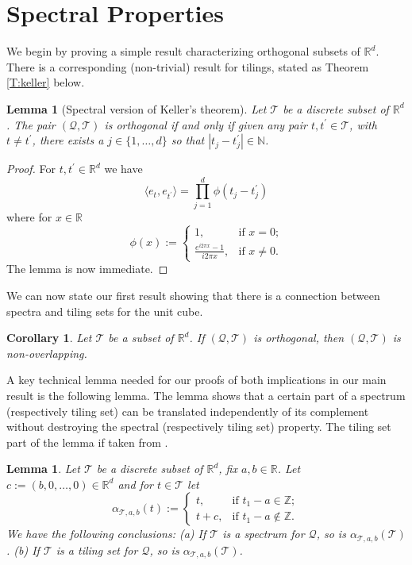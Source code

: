 \documentclass[12pt]{amsart}
\theoremstyle{plain}
\newtheorem{corollary}[theorem]{Corollary}
\newtheorem{lemma}[theorem]{Lemma}
\numberwithin{equation}{section}
\newcommand{\Q}{\ensuremath{\mathcal{Q}}\xspace}
\newcommand{\T}{\ensuremath{\mathcal{T}}\xspace}
\newcommand{\Rd}{\ensuremath{\mathbb{R}^{d}}\xspace}
\newcommand{\R}{\ensuremath{\mathbb{R}}\xspace}
\newcommand{\N}{\ensuremath{\mathbb{N}}\xspace}
\newcommand{\Z}{\ensuremath{\mathbb{Z}}\xspace}
\begin{document}

\section{Spectral Properties}\label{S:spectrum}
We begin by proving a simple result characterizing orthogonal subsets
of \Rd. There is a corresponding (non-trivial) result for tilings,
stated as Theorem \ref{T:keller} below.
\begin{lemma}[Spectral version of Keller's theorem]
\label{L:orthogonal}
   Let \T be a discrete subset of \Rd. The pair
   $(\Q,\T)$ is orthogonal if and only if
   given any pair
   $t,t^{\prime}\in\T$, with $t\neq t^{\prime}$, there exists a
   $j\in\{1,\ldots,d\}$ so that $|t_j-t^{\prime}_j|\in\N$.
\end{lemma}
\begin{proof} For $t,t^{\prime}\in\Rd$ we have
   \begin{equation}
      \langle e_t, e_{t^{\prime}} \rangle
      =\prod_{j=1}^d \phi(t_j-t^{\prime}_j)
   \end{equation}
   where for $x\in\R$
   \begin{equation}\label{E:phi}
      \phi(x):=
      \begin{cases}
         1,    &\text{if $x=0$;}\\
         \frac{e^{i2\pi x}-1}{i2\pi x},    &\text{if $x\neq 0$.}
      \end{cases}
   \end{equation}
   The lemma is now immediate.
\end{proof}
We can now state our first result showing that there is a connection
between spectra and tiling sets for the unit cube.
\begin{corollary}\label{C:packing}
   Let \T be a subset of \Rd.
   If $(\Q,\T)$ is orthogonal, then $(\Q,\T)$ is non-overlapping.
\end{corollary}
A key technical lemma needed for our proofs of both implications in
our main result is the following lemma. The lemma shows that
a certain part of
a spectrum (respectively tiling set) can be translated
independently of its
complement without destroying the spectral (respectively tiling set)
property. The tiling set part of the lemma if taken from \cite{Per1}.
\begin{lemma}\label{L:sliding}
   Let \T be a discrete subset of \Rd, fix $a,b\in\R$. Let
   $c:=(b,0,\ldots,0)\in\Rd$ and for $t\in\T$ let
   \begin{equation*}
      \alpha_{\T,a,b}(t)
         :=\begin{cases}
              t, &\text{if $t_1-a\in\Z$}; \\
              t+c, &\text{if $t_1-a\notin\Z$}.
           \end{cases}
   \end{equation*}
   We have the following conclusions:
   (a) If \T is a spectrum for \Q, so is $\alpha_{\T,a,b}(\T)$.
   (b) If \T is a tiling set for \Q, so is $\alpha_{\T,a,b}(\T)$.
\end{lemma}
\end{document}
